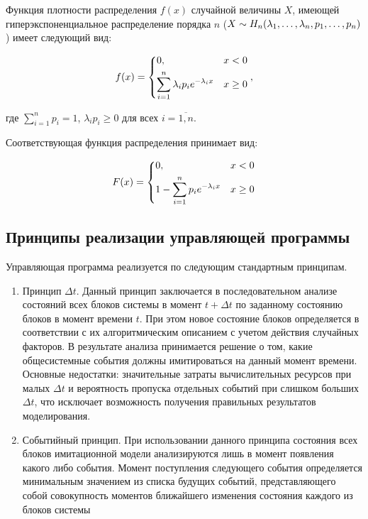 \documentclass[14pt, a4paper]{extarticle}
\begin{document}
Функция плотности распределения $f(x)$ случайной величины $X$, имеющей гиперэкспоненциальное распределение порядка $n$ ($X \sim H_n(\lambda_1, \dots, \lambda_n,\\ p_1, \dots, p_n)$) имеет следующий вид:

\begin{equation}
	f(x) = \begin{dcases}
		0, & x < 0\\
		\sum_{i=1}^{n}\lambda_ip_ie^{-\lambda_ix} & x \ge 0\\
	\end{dcases},
\end{equation}


где $\sum_{i=1}^np_i = 1$, $\lambda_ip_i \ge 0$ для всех $i=\overline{1, n}$.

Соответствующая функция распределения принимает вид:

\begin{equation}
	F(x)= \begin{dcases}
		0, & x < 0\\
		1-\sum_{i=1}^{n}p_ie^{-\lambda_ix} & x \ge 0\\
	\end{dcases}
\end{equation}

\subsection{Принципы реализации управляющей программы}

Управляющая программа реализуется по следующим стандартным принципам.

\begin{enumerate}
	\item Принцип $\Delta t$. Данный принцип заключается в последовательном анализе состояний всех блоков системы в момент $t + \Delta t$ по заданному состоянию блоков в момент времени $t$. При этом новое состояние блоков определяется в соответствии с их алгоритмическим описанием с учетом действия случайных факторов. В результате анализа принимается решение о том, какие общесистемные события  должны имитироваться на данный момент времени. Основные недостатки: значительные затраты вычислительных ресурсов при малых $\Delta t$ и вероятность пропуска отдельных событий при слишком больших
$\Delta t$, что исключает возможность получения правильных результатов моделирования.
	\item Событийный принцип. При использовании данного принципа состояния всех блоков имитационной модели анализируются лишь в момент появления какого либо события. Момент поступления следующего события определяется минимальным значением из списка будущих событий, представляющего собой совокупность моментов ближайшего изменения состояния каждого из блоков системы
\end{enumerate}
\end{document}
